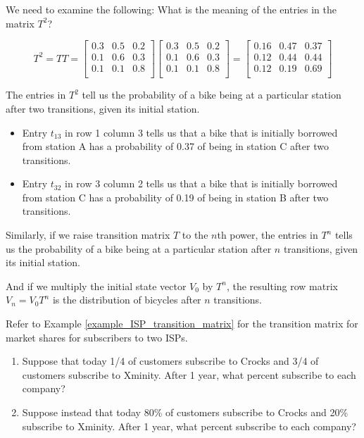 We need to examine the following: What is the meaning of the entries in the matrix \( T^2 \)?

\[
    T^2 = TT =
    \begin{bmatrix}
        0.3 & 0.5 & 0.2 \\
        0.1 & 0.6 & 0.3 \\
        0.1 & 0.1 & 0.8 \\
    \end{bmatrix}
    \begin{bmatrix}
        0.3 & 0.5 & 0.2 \\
        0.1 & 0.6 & 0.3 \\
        0.1 & 0.1 & 0.8 \\
    \end{bmatrix}
    =
    \begin{bmatrix}
        0.16 & 0.47 & 0.37 \\
        0.12 & 0.44 & 0.44 \\
        0.12 & 0.19 & 0.69 \\
    \end{bmatrix}
\]

The entries in \( T^2 \) tell us the probability of a bike being at a particular station after two transitions, given its initial station.

\begin{itemize}
    \item Entry \( t_{13} \) in row 1 column 3 tells us that a bike that is initially borrowed from station A has a probability of 0.37 of being in station C after two transitions.
    \item Entry \( t_{32} \) in row 3 column 2 tells us that a bike that is initially borrowed from station C has a probability of 0.19 of being in station B after two transitions.
\end{itemize}

Similarly, if we raise transition matrix \( T \) to the \( n \)th power, the entries in \( T^n \) tells us the probability of a bike being at a particular station after \( n \) transitions, given its initial station.

And if we multiply the initial state vector \( V_0 \) by \( T^n \), the resulting row matrix \( V_n=V_0T^n \) is the distribution of bicycles after \( n \) transitions.

\begin{example}
    Refer to Example \ref{example_ISP_transition_matrix} for the transition matrix for market shares for subscribers to two ISPs.
    \begin{enumerate}
        \item Suppose that today 1/4 of customers subscribe to Crocks and 3/4 of customers subscribe to Xminity. After 1 year, what percent subscribe to each company?
        \item Suppose instead that today 80\% of customers subscribe to Crocks and 20\% subscribe to Xminity. After 1 year, what percent subscribe to each company?
    \end{enumerate}
\end{example}

